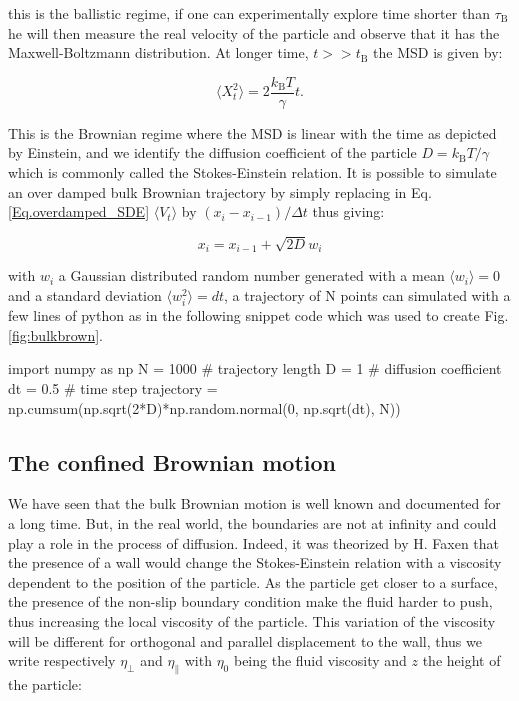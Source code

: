 this is the ballistic regime, if one can experimentally explore time shorter than $\tau _ \mathrm{B} $ he will then measure the real velocity of the particle and observe that it has the Maxwell-Boltzmann distribution. At longer time, $t >> t_\mathrm{B}$ the \gls{MSD} is given by:

\begin{equation}
	\langle X_t ^2 \rangle = 2 \frac{k_\mathrm{B}T}{\gamma} t.
\end{equation}

This is the Brownian regime where the \gls{MSD} is linear with the time as depicted by Einstein, and we identify the diffusion coefficient of the particle $ D = k_\mathrm{B} T / \gamma $ which is commonly called the Stokes-Einstein relation. It is possible to simulate an over damped bulk Brownian trajectory by simply replacing in Eq.\ref{Eq.overdamped_SDE} $\langle V_t \rangle $ by $(x_{i} - x_{i-1})/\Delta t $ thus giving:

\begin{equation}
	x_i = x_{i-1} + \sqrt{2D}w_i
\end{equation}

with $w_i$ a Gaussian distributed random number generated with a mean $\langle w_i \rangle = 0$ and a standard deviation $\langle w_i ^2 \rangle = dt$, a trajectory of N points can simulated with a few lines of python as in the following snippet code which was used to create Fig.\ref{fig:bulkbrown}.

\begin{python}
import numpy as np
N = 1000 # trajectory length
D = 1 # diffusion coefficient
dt = 0.5 # time step
trajectory = np.cumsum(np.sqrt(2*D)*np.random.normal(0, np.sqrt(dt), N))
\end{python}


\subsection{The confined Brownian motion}

We have seen that the bulk Brownian motion is well known and documented for a long time. But, in the real world, the boundaries are not at infinity and could play a role in the process of diffusion. Indeed, it was theorized by H. Faxen \cite{faxen_fredholm_1924} that the presence of a wall would change the Stokes-Einstein relation with a viscosity dependent to the position of the particle. As the particle get closer to a surface, the presence of the non-slip boundary condition make the fluid harder to push, thus increasing the local viscosity of the particle. This variation of the viscosity will be different for orthogonal and parallel displacement to the wall, thus we write respectively $\eta_\bot $ and $\eta_\parallel$ with $\eta_0$ being the fluid viscosity and $z$ the height of the particle:

